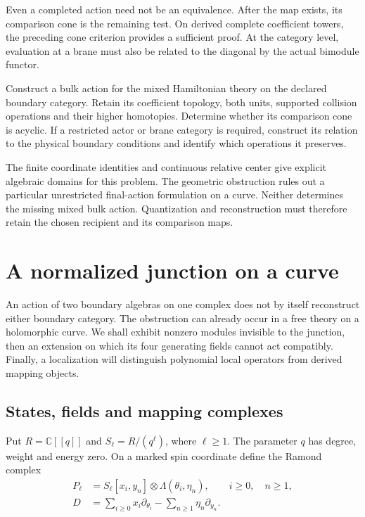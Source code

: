 Even a completed action need not be an
equivalence. After the map exists,
its comparison cone is the remaining
test. On derived complete coefficient
towers, the preceding cone criterion
provides a sufficient proof. At the
category level, evaluation at a brane
must also be related to the diagonal
by the actual bimodule functor.

\begin{problem}\label{mht:qn:physical-centre-comparison}
Construct a bulk action for the mixed Hamiltonian theory
on the declared boundary category. Retain its coefficient
topology, both units, supported collision operations and
their higher homotopies. Determine
whether its comparison cone is
acyclic. If a restricted actor or
brane category is required, construct
its relation to the physical boundary
conditions and identify which
operations it preserves.
\end{problem}

The finite coordinate identities and
continuous relative center give
explicit algebraic domains for this
problem. The geometric obstruction
rules out a particular unrestricted
final-action formulation on a curve.
Neither determines the missing mixed
bulk action. Quantization and
reconstruction must therefore retain
the chosen recipient and its
comparison maps.

\section{A normalized junction on a curve}
\label{mht:sec:ramond-junction}

An action of two boundary algebras on one complex does not by
itself reconstruct either boundary category. The obstruction can
already occur in a free theory on a holomorphic curve. We shall
exhibit nonzero modules invisible to the junction, then an
extension on which its four generating fields cannot act
compatibly. Finally, a localization will distinguish polynomial
local operators from derived mapping objects.

\subsection{States, fields and mapping complexes}

Put $R=\mathbb C[[q]]$ and $S_\ell=R/(q^\ell)$, where $\ell\geq1$.
The parameter $q$ has degree, weight and energy zero.
On a marked spin coordinate define the Ramond complex
\begin{align*}
 P_\ell&=S_\ell[x_i,y_n]\otimes\Lambda(\theta_i,\eta_n),
 \qquad i\geq0,\quad n\geq1,\\
 D&=\sum_{i\geq0}x_i\partial_{\theta_i}
       -\sum_{n\geq1}\eta_n\partial_{y_n}.
\end{align*}

